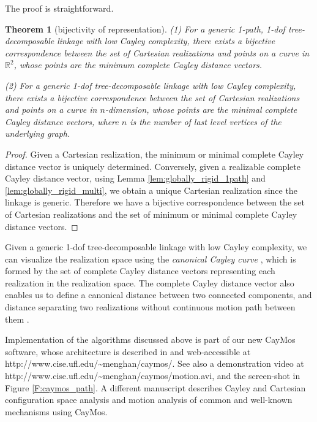 \documentclass[secthm,amsthm,english]{article}
\newtheorem{theorem}{Theorem}
\theoremstyle{definition}
\theoremstyle{remark}
\begin{document}
The proof is straightforward.




\smallskip

\begin{theorem}[bijectivity of representation] \label{thm:parameterize}
\noindent (1)
For a generic 1-path, 1-dof tree-decomposable linkage with low Cayley complexity, 
there exists a bijective correspondence between the set of Cartesian realizations and 
points on a curve in $\mathbb{R}^2$, whose points are the minimum complete Cayley distance vectors. 

\noindent (2)
For a generic 1-dof tree-decomposable linkage with low Cayley complexity, 
there exists a bijective correspondence between the set of Cartesian realizations and 
points on a curve in $n$-dimension, whose points are the minimal complete Cayley distance vectors, 
where $n$ is the number of last level vertices of the underlying graph. 
\end{theorem}


\vspace{-10pt}

\begin{proof}
Given a Cartesian realization, 
the minimum or minimal complete Cayley distance vector is  uniquely determined.
Conversely, given a realizable complete Cayley distance vector, 
using Lemma \ref{lem:globally_rigid_1path} and 
 \ref{lem:globally_rigid_multi}, 
we  obtain a unique Cartesian realization
since the linkage is generic. 
Therefore we have a bijective correspondence between the set of Cartesian realizations 
and the set of minimum or minimal complete Cayley distance vectors. 
\end{proof}




Given a generic 1-dof tree-decomposable linkage with low Cayley complexity,
we can visualize the realization space using the \emph{canonical Cayley curve} \cite{bib:beest},
which is formed by the set of complete Cayley distance vectors 
representing each realization in the realization space.
The complete Cayley distance vector also enables us
to define a canonical distance between two connected components,
and distance separating two realizations without continuous motion path between them \cite{bib:beest}.


\bigskip
\noindent 
Implementation of the algorithms  discussed above 
is part of our new CayMos software,
whose architecture is described in \cite{bib:caymos} and 
web-accessible at http://www.cise.ufl.edu/\~{}menghan/caymos/. 
See also a demonstration video at http://www.cise.ufl.edu/\~{}menghan/caymos/motion.avi, 
and the screen-shot in Figure \ref{F:caymos_path}. 
A different manuscript \cite{bib:beest} describes Cayley and Cartesian configuration space analysis and motion analysis 
of common and well-known mechanisms using CayMos.
\end{document}

